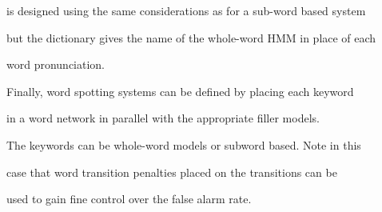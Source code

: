 is designed using the same considerations as for a sub-word based system


but the dictionary gives the name of the whole-word HMM in place of each


word pronunciation.





Finally, word spotting systems can be defined by placing each keyword


in a word network in parallel with the appropriate filler models.


The keywords can be whole-word models or subword based.  Note in this


case that word transition penalties placed on the transitions can be


used to gain fine control over the false alarm rate.
















